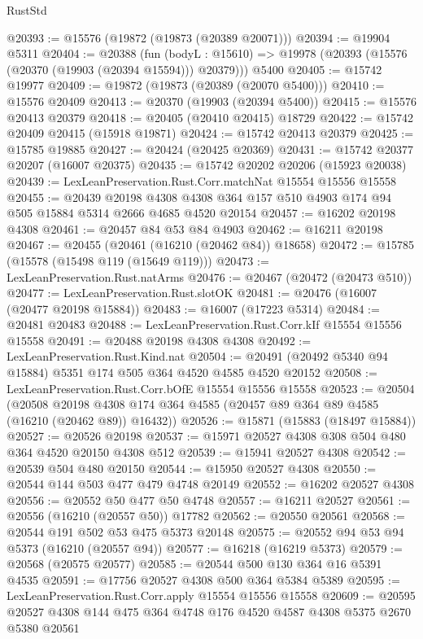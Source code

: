\begin{lexlean}{RustStd}
\begin{coremodule}
@20393 := @15576 (@19872 (@19873 (@20389 @20071)))
@20394 := @19904 @5311
@20404 := @20388
    (fun (bodyL : @15610) => @19978 (@20393 (@15576 (@20370 (@19903 (@20394 @15594))) @20379)))
    @5400
@20405 := @15742 @19977
@20409 := @19872 (@19873 (@20389 (@20070 @5400)))
@20410 := @15576 @20409
@20413 := @20370 (@19903 (@20394 @5400))
@20415 := @15576 @20413 @20379
@20418 := @20405 (@20410 @20415) @18729
@20422 := @15742 @20409 @20415 (@15918 @19871)
@20424 := @15742 @20413 @20379
@20425 := @15785 @19885
@20427 := @20424 (@20425 @20369)
@20431 := @15742 @20377 @20207 (@16007 @20375)
@20435 := @15742 @20202 @20206 (@15923 @20038)
@20439 := LexLeanPreservation.Rust.Corr.matchNat @15554 @15556 @15558
@20455 := @20439
    @20198
    @4308
    @4308
    @364
    @157
    @510
    @4903
    @174
    @94
    @505
    @15884
    @5314
    @2666
    @4685
    @4520
    @20154
@20457 := @16202 @20198 @4308
@20461 := @20457 @84 @53 @84 @4903
@20462 := @16211 @20198
@20467 := @20455 (@20461 (@16210 (@20462 @84)) @18658)
@20472 := @15785 (@15578 (@15498 @119 (@15649 @119)))
@20473 := LexLeanPreservation.Rust.natArms
@20476 := @20467 (@20472 (@20473 @510))
@20477 := LexLeanPreservation.Rust.slotOK
@20481 := @20476 (@16007 (@20477 @20198 @15884))
@20483 := @16007 (@17223 @5314)
@20484 := @20481 @20483
@20488 := LexLeanPreservation.Rust.Corr.kIf @15554 @15556 @15558
@20491 := @20488 @20198 @4308 @4308
@20492 := LexLeanPreservation.Rust.Kind.nat
@20504 := @20491 (@20492 @5340 @94 @15884) @5351 @174 @505 @364 @4520 @4585 @4520 @20152
@20508 := LexLeanPreservation.Rust.Corr.bOfE @15554 @15556 @15558
@20523 := @20504
    (@20508 @20198 @4308 @174 @364 @4585 (@20457 @89 @364 @89 @4585 (@16210 (@20462 @89)) @16432))
@20526 := @15871 (@15883 (@18497 @15884))
@20527 := @20526 @20198
@20537 := @15971 @20527 @4308 @308 @504 @480 @364 @4520 @20150 @4308 @512
@20539 := @15941 @20527 @4308
@20542 := @20539 @504 @480 @20150
@20544 := @15950 @20527 @4308
@20550 := @20544 @144 @503 @477 @479 @4748 @20149
@20552 := @16202 @20527 @4308
@20556 := @20552 @50 @477 @50 @4748
@20557 := @16211 @20527
@20561 := @20556 (@16210 (@20557 @50)) @17782
@20562 := @20550 @20561
@20568 := @20544 @191 @502 @53 @475 @5373 @20148
@20575 := @20552 @94 @53 @94 @5373 (@16210 (@20557 @94))
@20577 := @16218 (@16219 @5373)
@20579 := @20568 (@20575 @20577)
@20585 := @20544 @500 @130 @364 @16 @5391 @4535
@20591 := @17756 @20527 @4308 @500 @364 @5384 @5389
@20595 := LexLeanPreservation.Rust.Corr.apply @15554 @15556 @15558
@20609 := @20595 @20527 @4308 @144 @475 @364 @4748 @176 @4520 @4587 @4308 @5375 @2670 @5380 @20561

\end{coremodule}
\end{lexlean}
